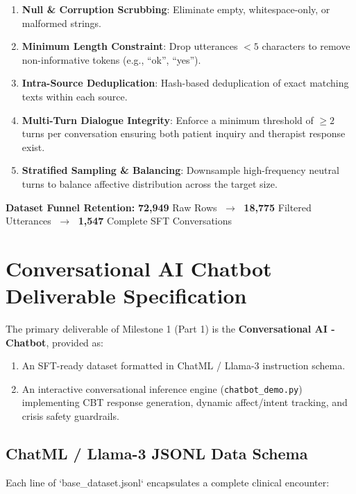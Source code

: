 \documentclass[11pt,a4paper]{article}
\begin{document}
\begin{enumerate}[label=\color{primaryblue}\textbf{Filter \arabic*:}, leftmargin=*]
  \item \textbf{Null \& Corruption Scrubbing}: Eliminate empty, whitespace-only, or malformed strings.
  \item \textbf{Minimum Length Constraint}: Drop utterances $< 5$ characters to remove non-informative tokens (e.g., ``ok'', ``yes'').
  \item \textbf{Intra-Source Deduplication}: Hash-based deduplication of exact matching texts within each source.
  \item \textbf{Multi-Turn Dialogue Integrity}: Enforce a minimum threshold of $\ge 2$ turns per conversation ensuring both patient inquiry and therapist response exist.
  \item \textbf{Stratified Sampling \& Balancing}: Downsample high-frequency neutral turns to balance affective distribution across the target size.
\end{enumerate}

\begin{tcolorbox}[metricCard]
\centering\sffamily
\textbf{Dataset Funnel Retention:} \quad
\textcolor{primaryblue}{\textbf{72,949}} Raw Rows $\;\longrightarrow\;$ 
\textcolor{clinicalteal}{\textbf{18,775}} Filtered Utterances $\;\longrightarrow\;$ 
\textcolor{accentcoral}{\textbf{1,547}} Complete SFT Conversations
\end{tcolorbox}

\section{Conversational AI Chatbot Deliverable Specification}

The primary deliverable of Milestone 1 (Part 1) is the \textbf{Conversational AI - Chatbot}, provided as:
\begin{enumerate}[label=\alph*)]
  \item An SFT-ready dataset formatted in ChatML / Llama-3 instruction schema.
  \item An interactive conversational inference engine (\texttt{chatbot\_demo.py}) implementing CBT response generation, dynamic affect/intent tracking, and crisis safety guardrails.
\end{enumerate}

\subsection{ChatML / Llama-3 JSONL Data Schema}
Each line of `base\_dataset.jsonl` encapsulates a complete clinical encounter:
\end{document}
